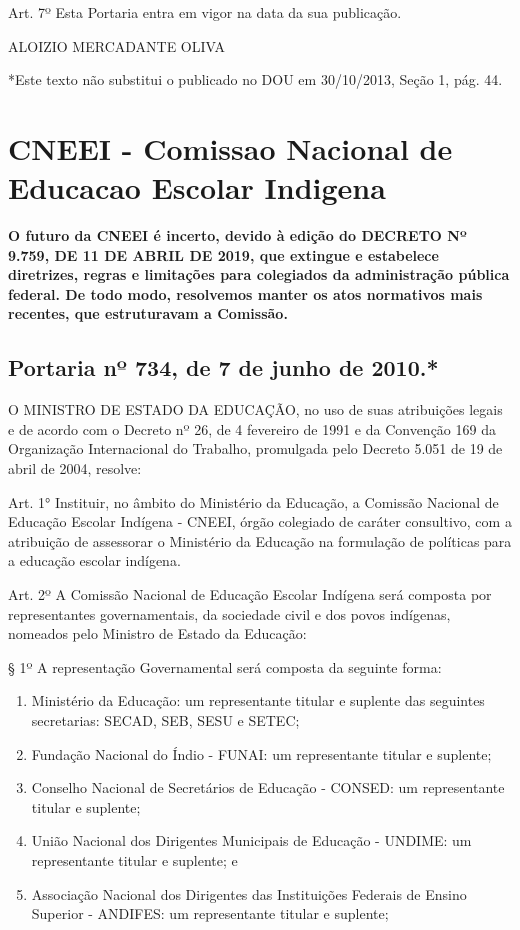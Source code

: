\documentclass[
]{book}
\begin{document}
Art. 7º Esta Portaria entra em vigor na data da sua publicação.

ALOIZIO MERCADANTE OLIVA

*Este texto não substitui o publicado no DOU em 30/10/2013, Seção 1, pág. 44.

\hypertarget{cneei---comissao-nacional-de-educacao-escolar-indigena}{%
\chapter{CNEEI - Comissao Nacional de Educacao Escolar Indigena}\label{cneei---comissao-nacional-de-educacao-escolar-indigena}}

\textbf{O futuro da CNEEI é incerto, devido à edição do DECRETO Nº 9.759, DE 11 DE ABRIL DE 2019, que extingue e estabelece diretrizes, regras e limitações para colegiados da administração pública federal. De todo modo, resolvemos manter os atos normativos mais recentes, que estruturavam a Comissão.}

\hypertarget{portaria-nuxba-734-de-7-de-junho-de-2010.}{%
\section{Portaria nº 734, de 7 de junho de 2010.*}\label{portaria-nuxba-734-de-7-de-junho-de-2010.}}

O MINISTRO DE ESTADO DA EDUCAÇÃO, no uso de suas atribuições legais e de acordo com o Decreto nº 26, de 4 fevereiro de 1991 e da Convenção 169 da Organização Internacional do Trabalho, promulgada pelo Decreto 5.051 de 19 de abril de 2004, resolve:

Art. 1° Instituir, no âmbito do Ministério da Educação, a Comissão Nacional de Educação Escolar Indígena - CNEEI, órgão colegiado de caráter consultivo, com a atribuição de assessorar o Ministério da Educação na formulação de políticas para a educação escolar indígena.

Art. 2º A Comissão Nacional de Educação Escolar Indígena será composta por representantes governamentais, da sociedade civil e dos povos indígenas, nomeados pelo Ministro de Estado da Educação:

§ 1º A representação Governamental será composta da seguinte forma:

\begin{enumerate}
\def\labelenumi{\alph{enumi})}
\item
  Ministério da Educação: um representante titular e suplente das seguintes secretarias: SECAD, SEB, SESU e SETEC;
\item
  Fundação Nacional do Índio - FUNAI: um representante titular e suplente;
\item
  Conselho Nacional de Secretários de Educação - CONSED: um representante titular e suplente;
\item
  União Nacional dos Dirigentes Municipais de Educação - UNDIME: um representante titular e suplente; e
\item
  Associação Nacional dos Dirigentes das Instituições Federais de Ensino Superior - ANDIFES: um representante titular e suplente;
\end{enumerate}
\end{document}

